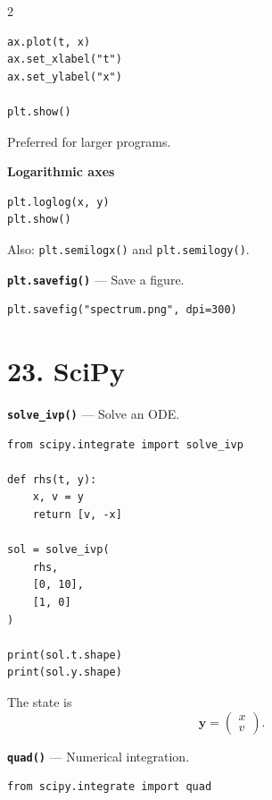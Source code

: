\documentclass[10pt,a4paper]{article}
\begin{document}
\begin{multicols}{2}
\begin{card}
\begin{lstlisting}[style=pythonstyle]
ax.plot(t, x)
ax.set_xlabel("t")
ax.set_ylabel("x")

plt.show()
\end{lstlisting}

Preferred for larger programs.
\end{card}

\begin{card}
\textbf{Logarithmic axes}

\begin{lstlisting}[style=pythonstyle]
plt.loglog(x, y)
plt.show()
\end{lstlisting}

Also:
\texttt{plt.semilogx()} and
\texttt{plt.semilogy()}.
\end{card}

\begin{card}
\textbf{\texttt{plt.savefig()}} --- Save a figure.

\begin{lstlisting}[style=pythonstyle]
plt.savefig("spectrum.png", dpi=300)
\end{lstlisting}
\end{card}

\section*{23. SciPy}

\begin{card}
\textbf{\texttt{solve\_ivp()}} --- Solve an ODE.

\begin{lstlisting}[style=pythonstyle]
from scipy.integrate import solve_ivp

def rhs(t, y):
    x, v = y
    return [v, -x]

sol = solve_ivp(
    rhs,
    [0, 10],
    [1, 0]
)

print(sol.t.shape)
print(sol.y.shape)
\end{lstlisting}

The state is
\[
\mathbf y=
\begin{pmatrix}
x\\
v
\end{pmatrix}.
\]
\end{card}

\begin{card}
\textbf{\texttt{quad()}} --- Numerical integration.

\begin{lstlisting}[style=pythonstyle]
from scipy.integrate import quad


\end{lstlisting}
\end{card}
\end{multicols}
\end{document}
